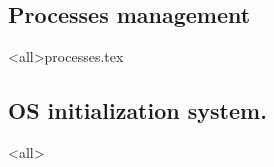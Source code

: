 \subsection{Processes management}
\mode<all>{{processes.tex}}
\subsection{OS initialization system.}
\mode<all>{}





